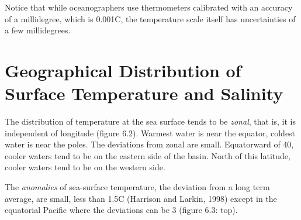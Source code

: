 Notice that while oceanographers use thermometers calibrated with an
accuracy of a millidegree, which is
0.001\degrees C, the temperature scale itself has uncertainties of a
few millidegrees.

\section[Geographical Distribution]{Geographical Distribution of Surface
Temperature and Salinity} The distribution
of temperature at the sea surface tends to be \textit{zonal},
that is, it is independent of longitude (figure
6.2). Warmest water is near the equator, coldest water is near the
poles. The deviations from zonal are small. Equatorward of 40\degrees,
cooler waters tend to be on the eastern side of the basin. North of
this latitude, cooler waters tend to be on the western side.

The \textit{anomalies} of sea-surface temperature, the deviation from a
long term average, are small, less than 1.5\degrees C (Harrison and
Larkin, 1998) except in the equatorial Pacific where the deviations
can be 3 (figure 6.3: top).

